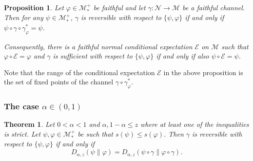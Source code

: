 \documentclass[12pt]{article}
\newtheorem{theorem}{Theorem}[section]
\newtheorem{prop}{Proposition} %
\theoremstyle{definition}
\theoremstyle{remark}
\def\Me{\mathcal M}
\def\Ne{\mathcal N}
\begin{document}
\begin{prop}\label{prop:universal} Let $\varphi\in \Me_*^+$ be faithful and let 
$\gamma:\Ne\to \Me$ be a faithful channel. Then for any $\psi\in \Me_*^+$, $\gamma$ is
reversible with respect to $\{\psi,\varphi\}$ if and only if $\psi\circ\gamma\circ
\gamma_\varphi^*=\psi$.

Consequently, there is a faithful normal conditional expectation $\mathcal E$ on $\Me$
such that $\varphi\circ \mathcal E=\varphi$ and $\gamma$ is sufficient with respect to
$\{\psi,\varphi\}$ if and only if also $\psi\circ\mathcal E=\psi$.

\end{prop}

Note that the range of the conditional expectation $\mathcal E$ in the above proposition
is the set  of fixed points of the channel $\gamma\circ\gamma_\varphi^*$. 

\subsubsection{The case $\alpha\in (0,1)$}

\begin{theorem}\label{thm:suff<1} Let $0<\alpha<1$ and $\alpha,1-\alpha\le
z$ where at least one of the inequalities is strict. Let $\psi,\varphi\in \Me_*^+$ be
such that $s(\psi)\le s(\varphi)$.
Then $\gamma$ is reversible with respect to
$\{\psi,\varphi\}$ if and only if
\[
D_{\alpha,z}(\psi\|\varphi)=D_{\alpha,z}(\psi\circ\gamma\|\varphi\circ\gamma).
\]

\end{theorem}
\end{document}
